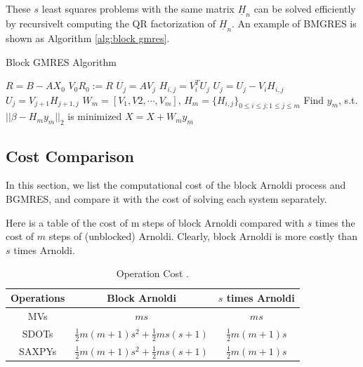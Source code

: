 These $s$ least squares problems with the same matrix  $\underline{H}_n$ can be solved efficiently by recursivelt computing the QR factorization of $\underline{H}_n$. An example of BMGRES is shown as Algorithm \ref{alg:block gmres}.
 
\begin{algorithm}[htbp]{}
	\caption{Block GMRES Algorithm}   
	\label{alg:block gmres}   
	\begin{algorithmic}[1]
		\State $R = B - AX_0$
		\State $V_0R_0 := R$ 
		\State $U_j = AV_{j}$  
		\State $H_{i,j} = V_i^T U_j$ 
		\State $U_j = U_j - V_iH_{i,j}$ 
		\EndFor
		\State $U_j = V_{j+1}H_{j+1,j}$  
		\EndFor
		\State $W_m = [V_1, V2, \cdots, V_m]$, $H_m = \{H_{i,j}\}_{0 \leq i \leq j; 1 \leq j \leq m}$ 
		\State Find $y_m$, s.t. $||\beta - H_my_m||_2$ is minimized
		\State $X = X + W_my_m$
		\EndFunction
	\end{algorithmic}  
\end{algorithm}

\subsection{Cost Comparison}

In this section, we list the computational cost of the block Arnoldi process and BGMRES, and compare it with the cost of solving each system separately.

Here is a table of the cost of m steps of block Arnoldi compared with $s$ times the cost of $m$ steps of (unblocked) Arnoldi. Clearly, block Arnoldi is more costly than $s$ times Arnoldi.

\begin{table}[htbp]
	\renewcommand{\arraystretch}{1.4}
	\small	
	\caption{Operation Cost \cite{gutknecht2006block}.}
	\label{block-arnoldi}
	\centering
	\begin{tabular}{c|c|c}
		\toprule
		\cellcolor{gray!50}Operations & \cellcolor{gray!50}Block Arnoldi & \cellcolor{gray!50}$s$ times Arnoldi  \\
		\midrule
		MVs  & $ms$ & $ms$ \\
		\cellcolor{gray!20}SDOTs & \cellcolor{gray!20}$\frac{1}{2}m(m+1)s^2+\frac{1}{2}ms(s+1)$ & \cellcolor{gray!20}$\frac{1}{2}m(m+1)s$   \\
		SAXPYs & $\frac{1}{2}m(m+1)s^2+\frac{1}{2}ms(s+1)$ & $\frac{1}{2}m(m+1)s$ \\
		\bottomrule
	\end{tabular}
\end{table}

